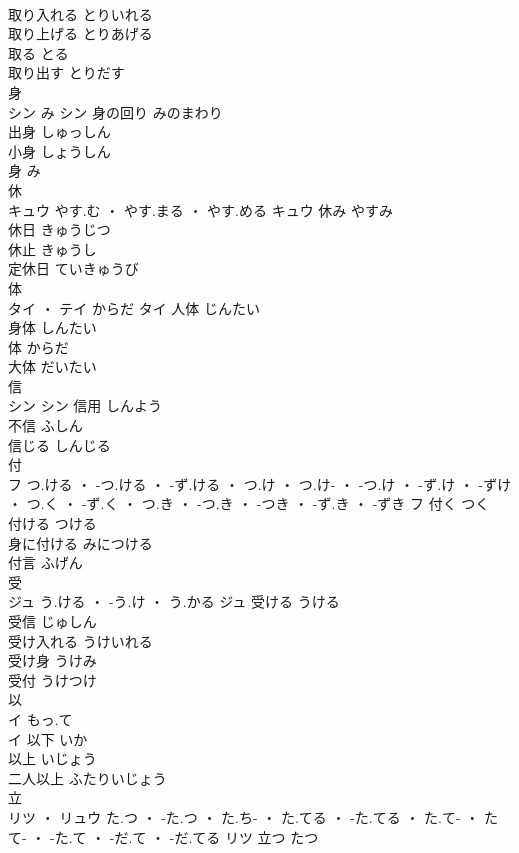 \documentclass[8pt]{extreport}
\begin{document}
\begin{CJK}{UTF8}{min}
\\	取り入れる	とりいれる	
\\	取り上げる	とりあげる	
\\	取る	とる	
\\	取り出す	とりだす	
\\	身	
\\	シン	み	シン	身の回り	みのまわり	
\\	出身	しゅっしん	
\\	小身	しょうしん	
\\	身	み	
\\	休	
\\	キュウ	やす.む ・ やす.まる ・ やす.める	キュウ	休み	やすみ	
\\	休日	きゅうじつ	
\\	休止	きゅうし	
\\	定休日	ていきゅうび	
\\	体	
\\	タイ ・ テイ	からだ	タイ	人体	じんたい	
\\	身体	しんたい	
\\	体	からだ	
\\	大体	だいたい	
\\	信	
\\	シン		シン	信用	しんよう	
\\	不信	ふしん	
\\	信じる	しんじる	
\\	付	
\\	フ	つ.ける ・ -つ.ける ・ -ず.ける ・ つ.け ・ つ.け- ・ -つ.け ・ -ず.け ・ -ずけ ・ つ.く ・ -ず.く ・ つ.き ・ -つ.き ・ -つき ・ -ず.き ・ -ずき	フ	付く	つく	
\\	付ける	つける	
\\	身に付ける	みにつける	
\\	付言	ふげん	
\\	受	
\\	ジュ	う.ける ・ -う.け ・ う.かる	ジュ	受ける	うける	
\\	受信	じゅしん	
\\	受け入れる	うけいれる	
\\	受け身	うけみ	
\\	受付	うけつけ	
\\	以	
\\	イ	もっ.て
\\	イ	以下	いか	
\\	以上	いじょう	
\\	二人以上	ふたりいじょう	
\\	立	
\\	リツ ・ リュウ	た.つ ・ -た.つ ・ た.ち- ・ た.てる ・ -た.てる ・ た.て- ・ たて- ・ -た.て ・ -だ.て ・ -だ.てる	リツ	立つ	たつ	

\end{CJK}
\end{document}
